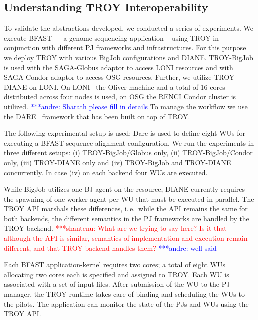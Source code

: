 \documentclass[conference,final]{IEEEtran}
\newcommand{\jhanote}[1]{ {\textcolor{red} { ***shantenu: #1 }}}
\newcommand{\alnote}[1]{ {\textcolor{blue} { ***andre: #1 }}}
\newcommand{\smnote}[1]{ {\textcolor{green} { ***sharath: #1 }}}
\newcommand{\alnote}[1]{}
\newcommand{\smnote}[1]{}
\newcommand{\jhanote}[1]{}
\begin{document}
\subsection{Understanding TROY Interoperability}

To validate the abstractions developed, we conducted a series of experiments. We
execute BFAST~\cite{bfast2009} -- a genome sequencing application -- using TROY
in conjunction with different PJ frameworks and infrastructures. For this
purpose we deploy TROY with various BigJob configurations and DIANE. TROY-BigJob
is used with the SAGA-Globus adaptor to access LONI resources and with
SAGA-Condor adaptor to access OSG resources. Further, we utilize TROY-DIANE on
LONI. On LONI~\cite{loni} the Oliver machine and a total of 16 cores distributed
across four nodes is used, on OSG the RENCI Condor cluster is utilized.
\alnote{Sharath please fill in details} To manage the workflow we use the
DARE~\cite{dare-tg11-gateways} framework that has been built on top of TROY.

The following experimental setup is used:  Dare is used to define eight WUs for 
executing a BFAST sequence alignment configuration. We run the experiments in 
three different setups: (i) TROY-BigJob/Globus only, (ii) TROY-BigJob/Condor 
only, (iii) TROY-DIANE only and (iv)  TROY-BigJob and TROY-DIANE concurrently. 
In case (iv) on each backend four WUs are executed.


While BigJob utilizes one BJ agent on the resource, DIANE currently requires the
spawning of one worker agent per WU that must be executed in parallel. The TROY
API marshals these differences, i.\,e.\ while the API remains the same for both
backends, the different semantics in the PJ frameworks are handled by the TROY
backend.
\jhanote{What are we trying to say here?  Is it that although the API
  is similar, semantics of implementation and execution remain
  different, and that TROY backend handles them?}\alnote{well said}

Each BFAST application-kernel requires two cores; a total of eight WUs
allocating two cores each is specified and assigned to TROY. Each WU
is associated with a set of input files. After submission of the WU to
the PJ manager, the TROY runtime takes care of binding and scheduling
the WUs to the pilots. The application can monitor the state of the
PJs and WUs using the TROY API.


\end{document}
